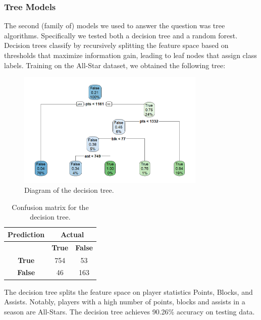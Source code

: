 \documentclass[12pt]{article}
\begin{document}
\subsubsection{Tree Models} The second (family of) models we used to answer the question was tree algorithms. Specifically we tested both a decision tree and a random forest. Decision trees classify by recursively splitting the feature space based on thresholds that maximize information gain, leading to leaf nodes that assign class labels. Training on the All-Star dataset, we obtained the following tree:

\begin{figure}[h]
    \centering
    \includegraphics[width=0.8\textwidth]{MM_AS_TREE_DIAGRAM.png}
    \caption{Diagram of the decision tree.}
    \label{fig:random_forest_confusion_matrix}
\end{figure}

\begin{table}[h]
    \centering
    \begin{tabular}{c|cc}
        \toprule
        \textbf{Prediction} & \multicolumn{2}{c}{\textbf{Actual}} \\
        \midrule
        & \textbf{True} & \textbf{False} \\
        \hline
        \textbf{True}  & 754  & 53  \\
        \textbf{False} & 46   & 163 \\
        \bottomrule
    \end{tabular}
    \caption{Confusion matrix for the decision tree.}
    \label{tab:decision_tree_confusion_matrix}
\end{table}

The decision tree splits the feature space on player statistics Points, Blocks, and Assists. Notably, players with a high number of points, blocks and assists in a season are All-Stars. The decision tree achieves 90.26\% accuracy on testing data.
\end{document}
